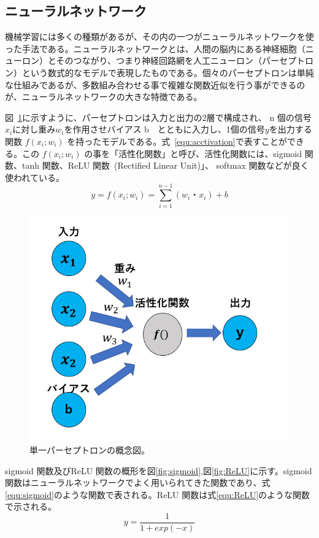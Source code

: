 \subsection{ニューラルネットワーク}
機械学習には多くの種類があるが、その内の一つがニューラルネットワークを使った手法である。ニューラルネットワークとは、人間の脳内にある神経細胞（ニューロン）とそのつながり、つまり神経回路網を人工ニューロン（パーセプトロン）という数式的なモデルで表現したものである。個々のパーセプトロンは単純な仕組みであるが、多数組み合わせる事で複雑な関数近似を行う事ができるのが、ニューラルネットワークの大きな特徴である。

図~\ref{fig:perce}に示すように、パーセプトロンは入力と出力の2層で構成され、 n 個の信号$x_i$に対し重み$w_i$を作用させバイアス b　とともに入力し、1個の信号$y$を出力する関数 $f(x_i; w_i)$ を持ったモデルである。式~\eqref{equ:acctivation}で表すことができる。この $f(x_i; w_i)$ の事を「活性化関数」と呼び、活性化関数には、sigmoid 関数、tanh 関数、ReLU 関数~(Rectified Linear Unit)」、 softmax 関数などが良く使われている。 
\begin{equation}
    y = f(x_i; w_i) = \sum^{n-1}_{i=1}(w_i・x_i) + b
    \label{equ:acctivation}
\end{equation}
\begin{figure}[tb]
  \centering
  \includegraphics[clip, width=13cm]{fig/4/parceptron.png}
  \caption{単一パーセプトロンの概念図。}
  \label{fig:perce}
\end{figure}
sigmoid 関数及びReLU 関数の概形を図\ref{fig:sigmoid},図\ref{fig:ReLU}に示す。sigmoid 関数はニューラルネットワークでよく用いられてきた関数であり、式\eqref{equ:sigmoid}のような関数で表される。ReLU 関数は式\eqref{equ:ReLU}のような関数で示される。
\begin{equation}
    y = \frac{1}{1+exp(-x)}
    \label{equ:sigmoid}
\end{equation}


